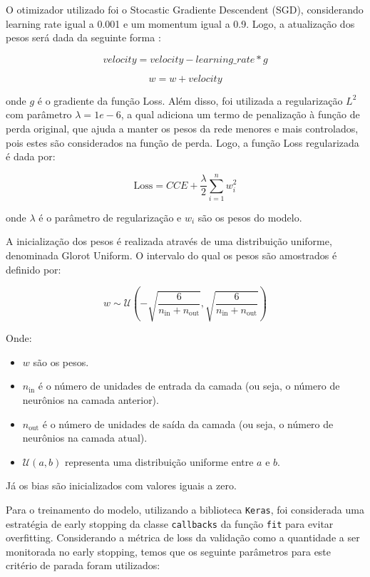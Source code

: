 \documentclass[]{abntex2}
\begin{document}
O otimizador utilizado foi o Stocastic Gradiente Descendent (SGD), considerando learning rate igual a 0.001 e um momentum igual a 0.9. Logo, a atualização dos pesos será dada da seguinte forma \cite{keras}:

\[
velocity = velocity - learning\_rate * g 
\]

\[
w = w + velocity
\]

onde \(g\) é o gradiente da função Loss. Além disso, foi utilizada a regularização \( L^2 \) com parâmetro \(\lambda = 1e-6\), a qual adiciona um termo de penalização à função de perda original, que ajuda a manter os pesos da rede menores e mais controlados, pois estes são considerados na função de perda. Logo, a função Loss regularizada é dada por:

\[
\text{Loss} = CCE + \dfrac{\lambda}{2} \sum_{i=1}^{n} w_i^2
\]

onde \(\lambda\) é o parâmetro de regularização e \(w_i\) são os pesos do modelo. 

A inicialização dos pesos é realizada através de uma distribuição uniforme, denominada Glorot Uniform. O intervalo do qual os pesos são amostrados é definido por:

\[
w \sim \mathcal{U}\left(-\sqrt{\frac{6}{n_{\text{in}} + n_{\text{out}}}}, \sqrt{\frac{6}{n_{\text{in}} + n_{\text{out}}}}\right)
\]

Onde:
\begin{itemize}
    \item \( w \) são os pesos.
    \item \( n_{\text{in}} \) é o número de unidades de entrada da camada (ou seja, o número de neurônios na camada anterior).
    \item \( n_{\text{out}} \) é o número de unidades de saída da camada (ou seja, o número de neurônios na camada atual).
    \item \( \mathcal{U}(a, b) \) representa uma distribuição uniforme entre \( a \) e \( b \).
\end{itemize}

Já os bias são inicializados com valores iguais a zero.

Para o treinamento do modelo, utilizando a biblioteca \texttt{Keras}, foi considerada uma estratégia de early stopping da classe \texttt{callbacks} da função \texttt{fit} para evitar overfitting. Considerando a métrica de loss da validação como a quantidade a ser monitorada no early stopping, temos que os seguinte parâmetros para este critério de parada foram utilizados:
\end{document}
